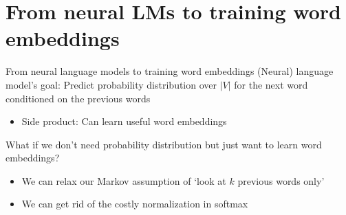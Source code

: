 \documentclass[12pt,aspectratio=169,handout]{beamer}
\begin{document}
\section{From neural LMs to training word embeddings}

\begin{frame}{From neural language models to training word embeddings}
(Neural) language model's goal: Predict probability distribution over $|V|$ for the next word conditioned on the previous words

\begin{itemize}
	\item Side product: Can learn useful word embeddings
\end{itemize}

\pause
What if we don't need probability distribution but just want to learn word embeddings?
\begin{itemize}
	\item We can relax our Markov assumption of `look at $k$ previous words only'
	\item We can get rid of the costly normalization in softmax
\end{itemize}
	
\end{frame}
\end{document}
